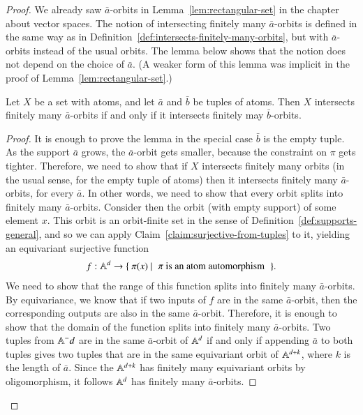 \begin{proof}
We already saw $\bar a$-orbits in Lemma~\ref{lem:rectangular-set} in the chapter about vector spaces. 
 The notion of intersecting finitely many $\bar a$-orbits is defined in the same way as in Definition~\ref{def:intersects-finitely-many-orbits}, but with  $\bar a$-orbits instead of the usual orbits. The lemma below shows that the notion does not depend on the choice of $\bar a$. (A weaker form of this lemma was implicit in the proof of Lemma~\ref{lem:rectangular-set}.)
	\begin{lemma} \label{lem:intersecting-nonequivariant} Let $X$ be a set with atoms, and let $\bar a$ and $\bar b$ be tuples of atoms. Then $X$ intersects finitely many $\bar a$-orbits if and only if it intersects finitely may $\bar b$-orbits. 
	\end{lemma}
	\begin{proof} 
	  It is enough to prove the lemma in the special case $\bar b$ is the empty tuple. 	As the support $\bar a$ grows, the $\bar a$-orbit gets smaller, because the constraint on $\pi$ gets tighter. Therefore, we need to show that if $X$ intersects finitely many orbits (in the usual sense, for the empty tuple of atoms) then it intersects finitely many $\bar a$-orbits, for every $\bar a$. In other words, we need to show that every orbit splits into finitely many $\bar a$-orbits. Consider then the orbit (with empty support) of some element $x$. This orbit  is an  orbit-finite set in the sense of Definition~\ref{def:supports-general}, and so we can apply Claim~\ref{claim:surjective-from-tuples} to it, yielding an equivariant surjective function
\begin{align*}
f : \atoms^d \to \setbuild{ \pi(x)} {$\pi$ is an atom automorphism}.
\end{align*}
We need to show that the range of this function splits into finitely many $\bar a$-orbits.  
	By equivariance, we know that if two inputs of $f$ are in the same $\bar a$-orbit, then the corresponding outputs are also in the same $\bar a$-orbit. Therefore, it is enough to show that the domain of the function splits into finitely many $\bar a$-orbits.  Two tuples from $\mathbb A^-d$  are in the same $\bar a$-orbit of $\mathbb A^d$ if and only if appending $\bar a$ to both tuples gives two tuples that are in the same equivariant orbit of $\mathbb A^{d+k}$, where $k$ is the length of $\bar a$. Since the $\mathbb A^{d+k}$ has finitely many equivariant orbits by oligomorphism, it follows $\mathbb A^d$ has finitely many $\bar a$-orbits.
	\end{proof}


\end{proof}
